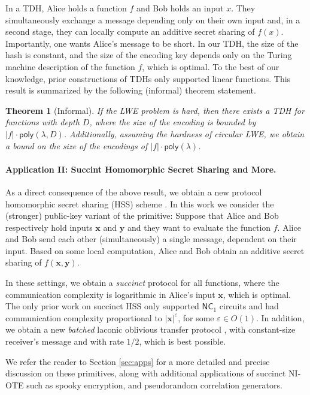 \documentclass{article}
\newtheorem{theorem}{Theorem}\newtheorem{lemma}[theorem]{Lemma}\newtheorem{proposition}[theorem]{Proposition}\newtheorem{corollary}[theorem]{Corollary}\newtheorem{definition}[theorem]{Definition}\newtheorem{claim}[theorem]{Claim}
\newcommand{\poly}{\mathsf{poly}}
\renewcommand{\sec}{\ensuremath{\lambda}}
\begin{document}
{In a TDH, Alice holds a function $f$ and Bob holds an input $x$. They simultaneously exchange a message depending only on their own input and, in a second stage, they can locally compute an additive secret sharing of $f(x)$. Importantly, one wants Alice's message to be short. In our TDH, the} size of the hash is constant, and the size of the encoding key depends only on the {Turing machine} description of the function $f$, which is optimal. {To the best of our knowledge, prior constructions of TDHs \cite{C:DGIMMO19,C:RoySin21} only supported linear functions.}
This result is summarized by the following (informal) theorem statement.
\begin{theorem}[Informal]
    If the LWE problem is hard, then there exists a TDH for functions with depth $D$, where the size of the encoding is bounded by {$|f|\cdot \poly(\sec, D)$}. Additionally, assuming the hardness of \emph{circular} LWE, we obtain a bound on the size of the encodings of $|f|\cdot \poly(\sec)$.
\end{theorem}



\paragraph{Application II: Succint Homomorphic Secret Sharing and More.}
As a direct consequence of the above result, we obtain a new protocol homomorphic secret sharing (HSS) scheme \cite{C:BoyGilIsh16}. {In this work we consider the (stronger) public-key variant of the primitive: Suppose that Alice and Bob respectively hold inputs $\mathbf{x}$ and $\mathbf{y}$ and they want to evaluate the function $f$. Alice and Bob send each other (simultaneously) a single message, dependent on their input. Based on some local computation, Alice and Bob obtain an additive secret sharing of $f(\mathbf{x}, \mathbf{y})$.}

{In these settings, we obtain a \emph{succinct} \cite{EC:AbrRoySch24} protocol for all functions, where the communication complexity is logarithmic in Alice's input} $\mathbf{x}$, which is optimal. The only prior work on succinct HSS \cite{EC:AbrRoySch24} only supported $\mathsf{NC}_1$ circuits and had communication complexity proportional to $\lvert \mathbf{x}\rvert^\varepsilon$, for some $\varepsilon\in O(1)$. In addition, we obtain a new \emph{batched} laconic oblivious transfer protocol \cite{C:CDGGMP17}, with constant-size receiver's message and with rate $1/2$, which is best possible. 

We refer the reader to Section \ref{sec:apps} for a more detailed and precise discussion on these primitives, along with additional applications of succinct NI-OTE such as spooky encryption, and pseudorandom correlation generators.
\end{document}
